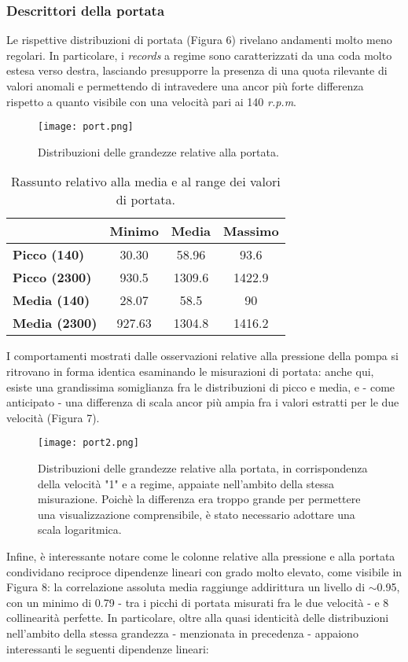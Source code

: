 \documentclass[fleqn,10pt]{SelfArx} %
\begin{document}
\subsubsection{Descrittori della portata}
Le rispettive distribuzioni di portata (Figura 6) rivelano andamenti molto meno regolari. In particolare, i \textit{records} a regime sono caratterizzati da una coda molto estesa verso destra, lasciando presupporre la presenza di una  quota rilevante di valori anomali e permettendo di intravedere una ancor più forte differenza rispetto a quanto visibile con una velocità pari ai 140 \textit{r.p.m}.  
\begin{figure}[h]
    \centering
    \texttt{[image: port.png]}
    \label{fig:em}
    \caption{Distribuzioni delle grandezze relative alla portata.}
\end{figure}
{\begin{table}[h]
\centering
\begin{tabular}[t]{lccc}
\toprule
&Minimo&Media&Massimo\\
\midrule
\textbf{Picco (140)}&30.30&58.96&93.6\\
\textbf{Picco (2300)}&930.5&1309.6&1422.9\\
\textbf{Media (140)}&28.07&58.5&90\\
\textbf{Media (2300)}&927.63&1304.8&1416.2\\
\bottomrule
\end{tabular}
\caption{Rassunto relativo alla media e al range dei valori di portata.}
\end{table}}
I comportamenti mostrati dalle osservazioni relative alla pressione della pompa si ritrovano in forma identica esaminando le misurazioni di portata: anche qui, esiste una grandissima somiglianza fra le distribuzioni di picco e media, e - come anticipato - una differenza di scala ancor più ampia fra i valori estratti per le due velocità (Figura 7).
\begin{figure}[H]
    \centering
    \texttt{[image: port2.png]}
    \label{fig:em}
    \caption{Distribuzioni delle grandezze relative alla portata, in corrispondenza della velocità "1" e a regime, appaiate nell'ambito della stessa misurazione. Poichè la differenza era troppo grande per permettere una visualizzazione comprensibile, è stato necessario adottare una scala logaritmica.}
\end{figure}
Infine, è interessante notare come le colonne relative alla pressione e alla portata condividano reciproce dipendenze lineari con grado molto elevato, come visibile in Figura 8: la correlazione assoluta media raggiunge addirittura un livello di $\sim$0.95, con un minimo di 0.79 - tra i picchi di portata misurati fra le due velocità - e 8 collinearità perfette. In particolare, oltre alla quasi identicità delle distribuzioni nell'ambito della stessa grandezza - menzionata in precedenza - appaiono interessanti le seguenti dipendenze lineari:
\end{document}
